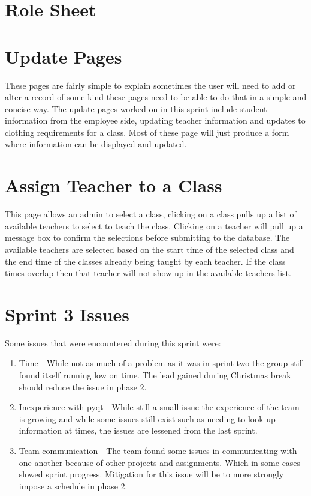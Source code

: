 \documentclass[11pt]{book}
\begin{document}
\section{Role Sheet}

\section{Update Pages}
These pages are fairly simple to explain sometimes the user will need to add or alter a record of some kind these pages need to be able to do that in a simple and concise way. The update pages worked on in this sprint include student information from the employee side, updating teacher information and updates to clothing requirements for a class. Most of these page will just produce a form where information can be displayed and updated.

\section{Assign Teacher to a Class}
This page allows an admin to select a class, clicking on a class pulls up a list of available teachers to select to teach the class. Clicking on a teacher will pull up a message box to confirm the selections before submitting to the database. The available teachers are selected based on the start time of the selected class and the end time of the classes already being taught by each teacher. If the class times overlap then that teacher will not show up in the available teachers list.

\section{Sprint 3 Issues}
Some issues that were encountered during this sprint were:

\begin{enumerate}
\item Time - While not as much of a problem as it was in sprint two the group still found itself running low on time. The lead gained during Christmas break should reduce the issue in phase 2.
\item Inexperience with pyqt - While still a small issue the experience of the team is growing and while some issues still exist such as needing to look up information at times, the issues are lessened from the last sprint.
\item Team communication - The team found some issues in communicating with one another because of other projects and assignments. Which in some cases slowed sprint progress. Mitigation for this issue will be to more strongly impose a schedule in phase 2.
\end{enumerate}
\end{document}
